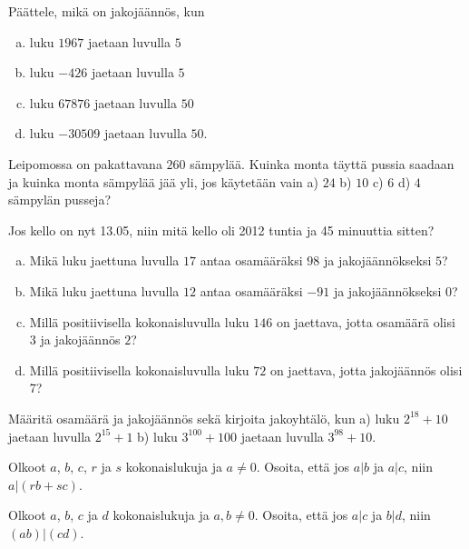 \begin{tehtavasivu}
\begin{tehtava}
	Päättele, mikä on jakojäännös, kun
	\begin{enumerate}[a)]
	\item luku $1967$ jaetaan luvulla $5$
	\item luku $-426$ jaetaan luvulla $5$
	\item luku $67876$ jaetaan luvulla $50$
	\item luku $-30509$ jaetaan luvulla $50$.
	\end{enumerate}
\end{tehtava}

\begin{tehtava}
	Leipomossa on pakattavana $260$ sämpylää. Kuinka monta täyttä pussia saadaan ja kuinka monta sämpylää jää yli, jos käytetään vain a) $24$ b) $10$ c) $6$ d) $4$ sämpylän pusseja?
\end{tehtava}

\begin{tehtava}
	Jos kello on nyt 13.05, niin mitä kello oli 2012 tuntia ja 45 minuuttia sitten?
\end{tehtava}

\begin{tehtava}
	\begin{enumerate}[a)]
	\item Mikä luku jaettuna luvulla $17$ antaa osamääräksi $98$ ja jakojäännökseksi $5$?
	\item Mikä luku jaettuna luvulla $12$ antaa osamääräksi $-91$ ja jakojäännökseksi $0$?
	\item Millä positiivisella kokonaisluvulla luku $146$ on jaettava, jotta osamäärä olisi $3$ ja jakojäännös $2$?
	\item Millä positiivisella kokonaisluvulla luku $72$ on jaettava, jotta jakojäännös olisi 7?
	\end{enumerate}
\end{tehtava}

\begin{tehtava}
	Määritä osamäärä ja jakojäännös sekä kirjoita jakoyhtälö, kun a) luku $2^{18} + 10$ jaetaan luvulla $2^{15} + 1$ b) luku $3^{100} + 100$ jaetaan luvulla $3^{98} + 10$.
\end{tehtava}

\begin{tehtava}
	Olkoot $a$, $b$, $c$, $r$ ja $s$ kokonaislukuja ja $a \neq 0$. Osoita, että jos $a|b$ ja $a|c$, niin $a|(rb + sc)$.
\end{tehtava}

\begin{tehtava}
	Olkoot $a$, $b$, $c$ ja $d$ kokonaislukuja ja $a, b \neq 0$. Osoita, että jos $a|c$ ja $b|d$, niin $(ab)|(cd)$.
\end{tehtava}


\end{tehtavasivu}
